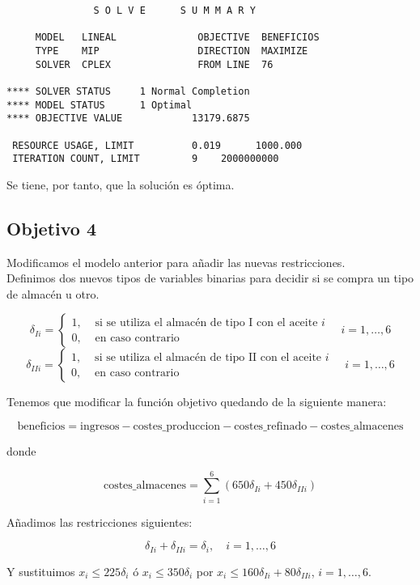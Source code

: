 \documentclass[12pt,a4paper,twoside,openright,titlepage,final]{article}
\begin{document}
\begin{verbatim}
               S O L V E      S U M M A R Y

     MODEL   LINEAL              OBJECTIVE  BENEFICIOS
     TYPE    MIP                 DIRECTION  MAXIMIZE
     SOLVER  CPLEX               FROM LINE  76

**** SOLVER STATUS     1 Normal Completion         
**** MODEL STATUS      1 Optimal                   
**** OBJECTIVE VALUE            13179.6875

 RESOURCE USAGE, LIMIT          0.019      1000.000
 ITERATION COUNT, LIMIT         9    2000000000
\end{verbatim}

Se tiene, por tanto, que la solución es óptima.

\subsection{Objetivo 4}

Modificamos el modelo anterior para añadir las nuevas restricciones.\\

Definimos dos nuevos tipos de variables binarias para decidir si se compra un tipo de almacén u otro.

\[ \delta_{Ii} = \begin{cases}
1, & \text{ si se utiliza el almacén de tipo I con el aceite } i\\
0, & \text{ en caso contrario}
\end{cases} \quad i = 1,\dots,6\]
\[\delta_{IIi} = \begin{cases}
1, & \text{ si se utiliza el almacén de tipo II con el aceite } i\\
0, & \text{ en caso contrario}
\end{cases} \quad i = 1,\dots,6\]

Tenemos que modificar la función objetivo quedando de la siguiente manera:

\[ \text{beneficios} = \text{ingresos} - \text{costes\_produccion} - \text{costes\_refinado} - \text{costes\_almacenes} \]

donde 

\[ \text{costes\_almacenes} = \sum_{i=1}^{6} (650\delta_{Ii} + 450\delta_{IIi}) \]

Añadimos las restricciones siguientes:

\[ \delta_{Ii} + \delta_{IIi} = \delta_i, \quad i = 1,\dots, 6 \]

Y sustituimos $x_i \leq 225\delta_i$ ó $x_i \leq 350\delta_i$ por $x_i \leq  160\delta_{Ii} + 80\delta_{IIi}$, $i=1,\dots,6$.\\
\end{document}
